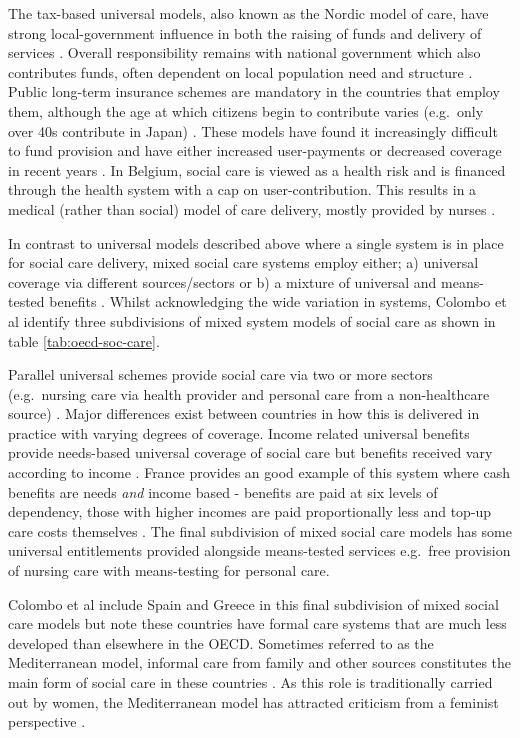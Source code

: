 \documentclass[12pt,]{report}
\begin{document}
The tax-based universal models, also known as the Nordic model of care,
have strong local-government influence in both the raising of funds and
delivery of services \citep{RN414, RN348, RN346, RN349}. Overall
responsibility remains with national government which also contributes
funds, often dependent on local population need and structure
\citep{RN414}. Public long-term insurance schemes are mandatory in the
countries that employ them, although the age at which citizens begin to
contribute varies (e.g.~only over 40s contribute in Japan)
\citep{RN414, RN413, RN407}. These models have found it increasingly
difficult to fund provision and have either increased user-payments or
decreased coverage in recent years \citep{RN345, RN413, RN407}. In
Belgium, social care is viewed as a health risk and is financed through
the health system with a cap on user-contribution. This results in a
medical (rather than social) model of care delivery, mostly provided by
nurses \citep{RN414}.

In contrast to universal models described above where a single system is
in place for social care delivery, mixed social care systems employ
either; a) universal coverage via different sources/sectors or b) a
mixture of universal and means-tested benefits \citep{RN414}. Whilst
acknowledging the wide variation in systems, Colombo et al
\citeyearpar{RN414} identify three subdivisions of mixed system models
of social care as shown in table \ref{tab:oecd-soc-care}.

Parallel universal schemes provide social care via two or more sectors
(e.g.~nursing care via health provider and personal care from a
non-healthcare source) \citep{RN414}. Major differences exist between
countries in how this is delivered in practice with varying degrees of
coverage. Income related universal benefits provide needs-based
universal coverage of social care but benefits received vary according
to income \citep{RN414}. France provides an good example of this system
where cash benefits are needs \emph{and} income based - benefits are
paid at six levels of dependency, those with higher incomes are paid
proportionally less and top-up care costs themselves
\citep{RN414, RN420}. The final subdivision of mixed social care models
has some universal entitlements provided alongside means-tested services
e.g.~free provision of nursing care with means-testing for personal
care.

Colombo et al \citeyearpar{RN414} include Spain and Greece in this final
subdivision of mixed social care models but note these countries have
formal care systems that are much less developed than elsewhere in the
OECD. Sometimes referred to as the Mediterranean model, informal care
from family and other sources constitutes the main form of social care
in these countries \citep{RN348, RN346, RN349}. As this role is
traditionally carried out by women, the Mediterranean model has
attracted criticism from a feminist perspective \citep{RN346}.
\end{document}

